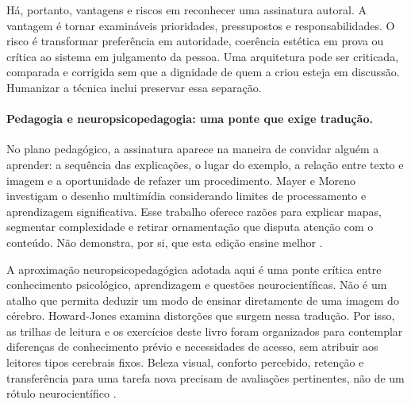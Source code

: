 Há, portanto, vantagens e riscos em reconhecer uma assinatura autoral.
A vantagem é tornar examináveis prioridades, pressupostos e responsabilidades.
O risco é transformar preferência em autoridade, coerência estética em prova
ou crítica ao sistema em julgamento da pessoa. Uma arquitetura pode ser
criticada, comparada e corrigida sem que a dignidade de quem a criou esteja
em discussão. Humanizar a técnica inclui preservar essa separação.

\paragraph{Pedagogia e neuropsicopedagogia: uma ponte que exige tradução.}
No plano pedagógico, a assinatura aparece na maneira de convidar alguém a
aprender: a sequência das explicações, o lugar do exemplo, a relação entre
texto e imagem e a oportunidade de refazer um procedimento. Mayer e Moreno
investigam o desenho multimídia considerando limites de processamento e
aprendizagem significativa. Esse trabalho oferece razões para explicar mapas,
segmentar complexidade e retirar ornamentação que disputa atenção com o
conteúdo. Não demonstra, por si, que esta edição ensine melhor
.

A aproximação neuropsicopedagógica adotada aqui é uma ponte crítica entre
conhecimento psicológico, aprendizagem e questões neurocientíficas. Não é um
atalho que permita deduzir um modo de ensinar diretamente de uma imagem do
cérebro. Howard-Jones examina distorções que surgem nessa tradução. Por isso,
as trilhas de leitura e os exercícios deste livro foram organizados para
contemplar diferenças de conhecimento prévio e necessidades de acesso, sem atribuir aos leitores tipos
cerebrais fixos. Beleza visual, conforto percebido, retenção e transferência
para uma tarefa nova precisam de avaliações pertinentes, não de um rótulo
neurocientífico
.


